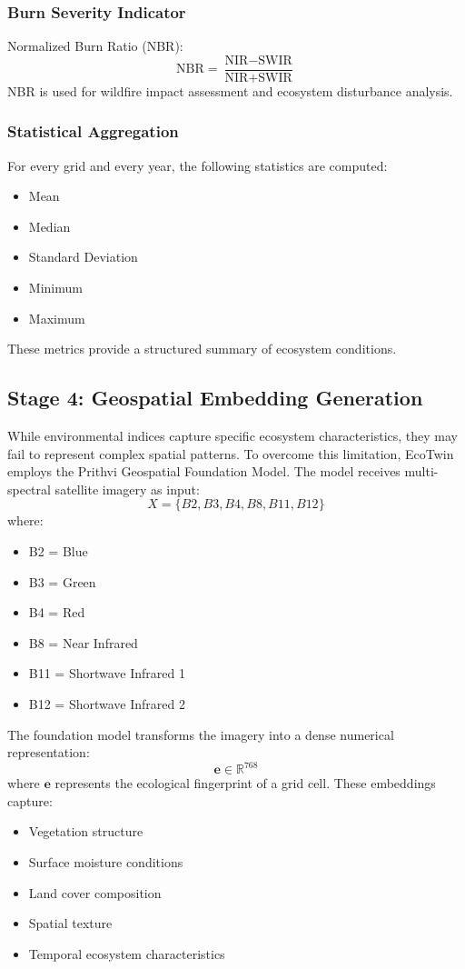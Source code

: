 \documentclass[11pt,a4paper]{article}
\begin{document}
\subsubsection{Burn Severity Indicator}
Normalized Burn Ratio (NBR):
\[
\text{NBR} = \frac{\text{NIR} - \text{SWIR}}{\text{NIR} + \text{SWIR}}
\]
NBR is used for wildfire impact assessment and ecosystem disturbance analysis.

\subsubsection{Statistical Aggregation}
For every grid and every year, the following statistics are computed:
\begin{itemize}
\item Mean
\item Median
\item Standard Deviation
\item Minimum
\item Maximum
\end{itemize}
These metrics provide a structured summary of ecosystem conditions.

\subsection{Stage 4: Geospatial Embedding Generation}
While environmental indices capture specific ecosystem characteristics, they may fail to represent complex spatial patterns. To overcome this limitation, EcoTwin employs the Prithvi Geospatial Foundation Model. The model receives multi-spectral satellite imagery as input:
\[
X = \{B2, B3, B4, B8, B11, B12\}
\]
where:
\begin{itemize}
\item B2 = Blue
\item B3 = Green
\item B4 = Red
\item B8 = Near Infrared
\item B11 = Shortwave Infrared 1
\item B12 = Shortwave Infrared 2
\end{itemize}
The foundation model transforms the imagery into a dense numerical representation:
\[
\mathbf{e} \in \mathbb{R}^{768}
\]
where $\mathbf{e}$ represents the ecological fingerprint of a grid cell. These embeddings capture:
\begin{itemize}
\item Vegetation structure
\item Surface moisture conditions
\item Land cover composition
\item Spatial texture
\item Temporal ecosystem characteristics
\end{itemize}
\end{document}

